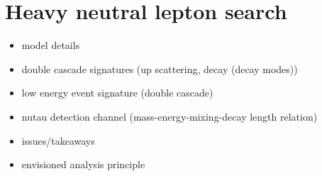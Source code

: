 \documentclass[a4paper,11pt]{article}
\begin{document}
\section{Heavy neutral lepton search}

\begin{itemize}
  \item model details
  \item double cascade signatures (up scattering, decay (decay modes))
  \item low energy event signature (double cascade)
  \item nutau detection channel (mass-energy-mixing-decay length relation)
  \item issues/takeaways
  \item envisioned analysis principle
\end{itemize}








\end{document}
